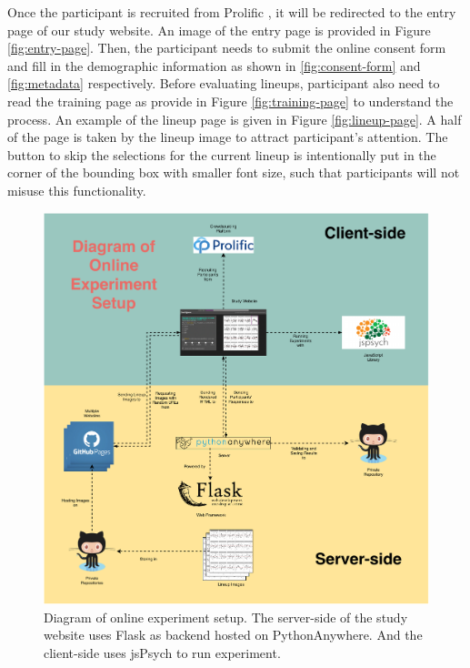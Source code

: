 \documentclass[]{interact}
\theoremstyle{plain}%
\theoremstyle{definition}
\theoremstyle{remark}
\begin{document}
Once the participant is recruited from Prolific
\citep{palan2018prolific}, it will be redirected to the entry page of
our study website. An image of the entry page is provided in Figure
\ref{fig:entry-page}. Then, the participant needs to submit the online
consent form and fill in the demographic information as shown in
\ref{fig:consent-form} and \ref{fig:metadata} respectively. Before
evaluating lineups, participant also need to read the training page as
provide in Figure \ref{fig:training-page} to understand the process. An
example of the lineup page is given in Figure \ref{fig:lineup-page}. A
half of the page is taken by the lineup image to attract participant's
attention. The button to skip the selections for the current lineup is
intentionally put in the corner of the bounding box with smaller font
size, such that participants will not misuse this functionality.

\begin{figure}

{\centering \includegraphics[width=1\linewidth]{figures/experiment_tech} 

}

\caption{Diagram of online experiment setup. The server-side of the study website uses Flask as backend hosted on PythonAnywhere. And the client-side uses jsPsych to run experiment.}\label{fig:tech}
\end{figure}
\end{document}
